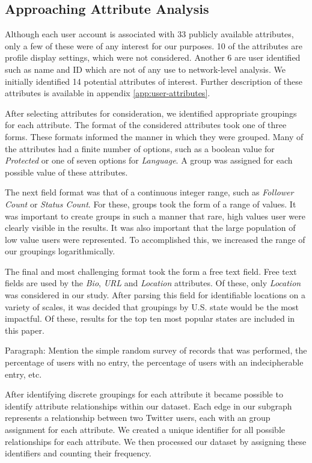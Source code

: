 \subsection{Approaching Attribute Analysis}

Although each user account is associated with 33 publicly available attributes, only a few of these were of any interest for our purposes.  10 of the attributes are profile display settings, which were not considered.  Another 6 are user identified such as name and ID which are not of any use to network-level analysis.  We initially identified 14 potential attributes of interest.  Further description of these attributes is available in appendix \ref{app:user-attributes}.

After selecting attributes for consideration, we identified appropriate groupings for each attribute.  The format of the considered attributes took one of three forms.  These formats informed the manner in which they were grouped.  Many of the attributes had a finite number of options, such as a boolean value for \textit{Protected} or one of seven options for \textit{Language}.  A group was assigned for each possible value of these attributes.

The next field format was that of a continuous integer range, such as \textit{Follower Count} or \textit{Status Count}.  For these, groups took the form of a range of values.  It was important to create groups in such a manner that rare, high values user were clearly visible in the results.  It was also important that the large population of low value users were represented.  To accomplished this, we increased the range of our groupings logarithmically.

The final and most challenging format took the form a free text field.  Free text fields are used by the \textit{Bio}, \textit{URL} and \textit{Location} attributes.  Of these, only \textit{Location} was considered in our study.  After parsing this field for identifiable locations  on a variety of scales, it was decided that groupings by U.S. state would be the most impactful.  Of these, results for the top ten most popular states are included in this paper.

Paragraph: Mention the simple random survey of records that was performed, the percentage of users with no entry, the percentage of users with an indecipherable entry, etc.

After identifying discrete groupings for each attribute it became possible to identify attribute relationships within our dataset.  Each edge in our subgraph represents a relationship between two Twitter users, each with an group assignment for each attribute.  We created a unique identifier for all possible relationships for each attribute.  We then processed our dataset by assigning these identifiers and counting their frequency.

